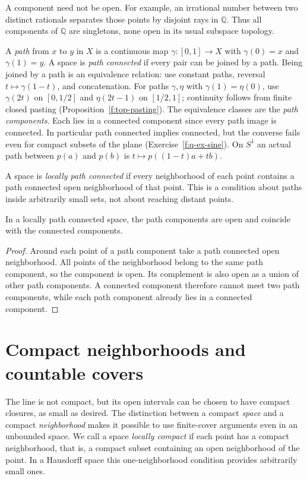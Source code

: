 A component need not be open. For example, an irrational number between two distinct rationals separates those points by disjoint rays in $\mathbb Q$. Thus all components of $\mathbb Q$ are singletons, none open in its usual subspace topology.

A \emph{path} from $x$ to $y$ in $X$ is a continuous map $\gamma:[0,1]\to X$ with $\gamma(0)=x$ and $\gamma(1)=y$. A space is \emph{path connected} if every pair can be joined by a path. Being joined by a path is an equivalence relation: use constant paths, reversal $t\mapsto\gamma(1-t)$, and concatenation. For paths $\gamma,\eta$ with $\gamma(1)=\eta(0)$, use $\gamma(2t)$ on $[0,1/2]$ and $\eta(2t-1)$ on $[1/2,1]$; continuity follows from finite closed pasting (Proposition~\ref{f:top-pasting}). The equivalence classes are the \emph{path components}. Each lies in a connected component since every path image is connected. In particular path connected implies connected, but the converse fails even for compact subsets of the plane (Exercise~\ref{f:q-ex-sine}). On $S^1$ an actual path between $p(a)$ and $p(b)$ is $t\mapsto p((1-t)a+tb)$.

A space is \emph{locally path connected} if every neighborhood of each point contains a path connected open neighborhood of that point. This is a condition about paths inside arbitrarily small sets, not about reaching distant points.

\begin{proposition}\label{f:q-local-path}
In a locally path connected space, the path components are open and coincide with the connected components.
\end{proposition}
\begin{proof}
Around each point of a path component take a path connected open neighborhood. All points of the neighborhood belong to the same path component, so the component is open. Its complement is also open as a union of other path components. A connected component therefore cannot meet two path components, while each path component already lies in a connected component.
\end{proof}

\section{Compact neighborhoods and countable covers}

The line is not compact, but its open intervals can be chosen to have compact closures, as small as desired. The distinction between a compact \emph{space} and a compact \emph{neighborhood} makes it possible to use finite-cover arguments even in an unbounded space. We call a space \emph{locally compact} if each point has a compact neighborhood, that is, a compact subset containing an open neighborhood of the point. In a Hausdorff space this one-neighborhood condition provides arbitrarily small ones.

